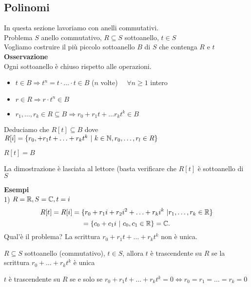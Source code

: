 \documentclass{article}
\begin{document}
	 \subsection{Polinomi}
	 In questa sezione lavoriamo con anelli commutativi.\\
	 Problema $S$ anello commutativo, $R\subseteq S$ sottoanello, $t\in S$\\
	 Vogliamo costruire il più piccolo sottoanello $B$ di $S$ che contenga $R$ e $t$\\
	 \textbf{Osservazione}\\
	 Ogni sottoanello è chiuso rispetto alle operazioni.\\
	 \begin{itemize}
		 \item $t\in B \Rightarrow t^n = t\cdot\ldots\cdot t\in B$ ($n$ volte) \ \ $\forall n\geq 1$ intero
		 \item  $r\in R \Rightarrow r\cdot t^n \in B$ 
		 \item $r_1,\ldots, r_k\in R\subseteq B \Rightarrow r_0 + r_1t + \ldots r_kt^k\in B$ \\
	 \end{itemize}
	 Deduciamo che $R[t]\subseteq B$ dove $R[i] = \{r_0, + r_1 t + \ldots + r_k t^k \ | \ k\in\mathbb{N}, r_0,\ldots, r_l\in R\}$
	 \begin{prop}
		 $R[t]=B$
	 \end{prop}
	 \begin{dimo}
		 La dimostrazione è lasciata al lettore (basta verificare che $R[t] $ è sottoanello di $S$
	 \end{dimo}
	 \textbf{Esempi}\\
	 1) $R = \mathbb{R}, S=\mathbb{C}, t=i$
	  \[
		  R[t] = R[i] = \{r_0 + r_1i + r_2i^2 + \ldots + r_ki^k \ | r_1,\ldots,r_k\in \mathbb{R}\}
	 \] 
	 \[
	  = \{c_0 + c_1i \ | \ c_0,c_1\in\mathbb{R}\} = \mathbb{C}
	 .\] 
	 Qual'è il problema? La scrittura $r_0 + r_1t + \ldots + r_kt^k$ non è unica.
	 \begin{defi}
	 	$R\subseteq S$ sottoanello (commutativo), $t\in S$, allora $t$ è trascendente su $R$ se la scrittura $r_0 + \ldots + r_kt^k$ è unica
	 \end{defi}
	 \begin{prop}
	 	$t$ è trascendente su $R$ se e solo se $r_0 + r_1t + \ldots + r_kt^k = 0 \Leftrightarrow r_0= r_1= \ldots = r_k = 0$
	 \end{prop}
\end{document}
